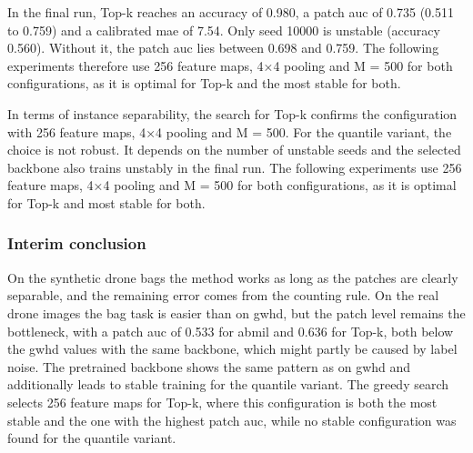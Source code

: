 \documentclass[12pt,parskip = half, DIV=classic,listof=totoc]{scrartcl}
\begin{document}
			In the final run, Top-k reaches an accuracy of 0.980, a patch \ac{auc} of 0.735 (0.511 to 0.759) and a 
			calibrated \ac{mae} of 7.54. Only seed 10000 is unstable (accuracy 0.560). Without it, the patch \ac{auc} lies 
			between 0.698 and 0.759. The following experiments therefore use 256 feature maps, 
			4×4 pooling and M = 500 for both configurations, as it is optimal for Top-k and the most stable for both.

			In terms of instance separability, the search for Top-k confirms the configuration with
			256 feature maps, 4×4 pooling and M = 500. For the quantile variant, the choice is not
			robust. It depends on the number of unstable seeds and the selected backbone also trains unstably
			in the final run. The following experiments use 256
			feature maps, 4×4 pooling and M = 500 for both configurations, as it is optimal for Top-k and 
			most stable for both.


			\subsubsection{Interim conclusion}
			On the synthetic drone bags the method works as long as the patches are clearly separable, 
			and the remaining error comes from the counting rule. On the real drone images the bag task is 
			easier than on \ac{gwhd}, but the patch level remains the bottleneck, with a patch \ac{auc} of 0.533 
			for \ac{abmil} and 0.636 for Top-k, both below the \ac{gwhd} values with the same backbone, which might 
			partly be caused by label noise. The pretrained backbone shows the same pattern as on \ac{gwhd} and 
			additionally leads to stable training for the quantile variant. The greedy search selects 256 feature 
			maps for Top-k, where this configuration is both the most stable and the one with the highest patch \ac{auc}, 
			while no stable configuration was found for the quantile variant.
\end{document}
